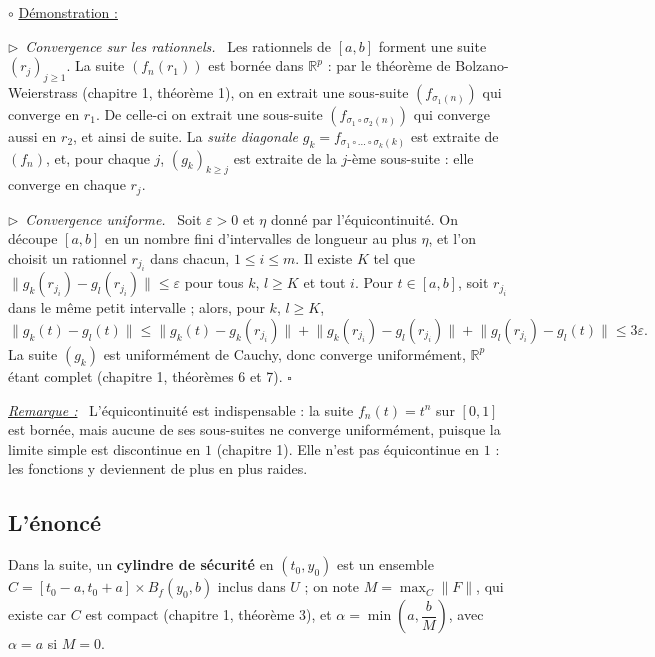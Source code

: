 \documentclass[a4paper,twoside]{report}
\newcommand{\mot}[1]{\textcolor{rougecours}{\textbf{#1}}}
\newenvironment{demo}%
 {\par\needspace{4\baselineskip}\vspace{1mm}\noindent$\circ$ \underline{Démonstration :}~\setlength{\parskip}{3pt plus 1pt}}%
 {\hfill$\square$\par\vspace{2mm}}
\newcommand{\etape}[1]{\par\smallskip\noindent$\triangleright$~\textit{#1}~}
\newenvironment{remarque}%
 {\par\needspace{6\baselineskip}\vspace{1mm}\begin{list}{}{\leftmargin=1cm \rightmargin=0.5cm}\item[]%
  \textit{\underline{Remarque :}}~}%
 {\end{list}\vspace{1mm}}
\newcommand{\R}{\mathbb{R}}
\newcommand{\norme}[1]{\lVert #1 \rVert}         %
\newcommand{\Bf}{B_{f}}                           %
\begin{document}
\begin{demo}
\etape{Convergence sur les rationnels.} Les rationnels de $[a, b]$ forment une suite $(r_{j})_{j \geqslant 1}$. La suite $(f_{n}(r_{1}))$ est bornée dans $\R^{p}$ : par le théorème de Bolzano-Weierstrass (chapitre 1, théorème 1), on en extrait une sous-suite $(f_{\sigma_{1}(n)})$ qui converge en $r_{1}$. De celle-ci on extrait une sous-suite $(f_{\sigma_{1}\circ\sigma_{2}(n)})$ qui converge aussi en $r_{2}$, et ainsi de suite. La \emph{suite diagonale} $g_{k} = f_{\sigma_{1}\circ\dots\circ\sigma_{k}(k)}$ est extraite de $(f_{n})$, et, pour chaque $j$, $(g_{k})_{k \geqslant j}$ est extraite de la $j$-ème sous-suite : elle converge en chaque $r_{j}$.

\etape{Convergence uniforme.} Soit $\varepsilon > 0$ et $\eta$ donné par l'équicontinuité. On découpe $[a, b]$ en un nombre fini d'intervalles de longueur au plus $\eta$, et l'on choisit un rationnel $r_{j_{i}}$ dans chacun, $1 \leqslant i \leqslant m$. Il existe $K$ tel que $\norme{g_{k}(r_{j_{i}}) - g_{l}(r_{j_{i}})} \leqslant \varepsilon$ pour tous $k$, $l \geqslant K$ et tout $i$. Pour $t \in [a, b]$, soit $r_{j_{i}}$ dans le même petit intervalle ; alors, pour $k$, $l \geqslant K$,
\[ \norme{g_{k}(t) - g_{l}(t)} \leqslant \norme{g_{k}(t) - g_{k}(r_{j_{i}})} + \norme{g_{k}(r_{j_{i}}) - g_{l}(r_{j_{i}})} + \norme{g_{l}(r_{j_{i}}) - g_{l}(t)} \leqslant 3\varepsilon. \]
La suite $(g_{k})$ est uniformément de Cauchy, donc converge uniformément, $\R^{p}$ étant complet (chapitre 1, théorèmes 6 et 7).
\end{demo}

\begin{remarque}
L'équicontinuité est indispensable : la suite $f_{n}(t) = t^{n}$ sur $[0, 1]$ est bornée, mais aucune de ses sous-suites ne converge uniformément, puisque la limite simple est discontinue en $1$ (chapitre 1). Elle n'est pas équicontinue en $1$ : les fonctions y deviennent de plus en plus raides.
\end{remarque}

\subsection{L'énoncé}

Dans la suite, un \mot{cylindre de sécurité} en $(t_{0}, y_{0})$ est un ensemble $C = [t_{0} - a, t_{0} + a] \times \Bf(y_{0}, b)$ inclus dans $U$ ; on note $M = \max_{C}\norme{F}$, qui existe car $C$ est compact (chapitre 1, théorème 3), et $\alpha = \min\left(a, \dfrac{b}{M}\right)$, avec $\alpha = a$ si $M = 0$.
\end{document}
